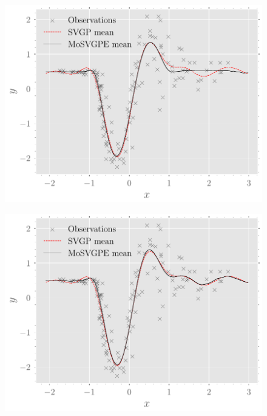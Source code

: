 \documentclass{mimosis-class/mimosis}
\numberwithin{equation}{chapter}
\begin{document}
{\begin{figure}[t!]
\centering
\begin{minipage}[r]{0.49\textwidth}
\includegraphics[width=\textwidth]{./images/model/mcycle/K=3_L2/y_means.pdf}
\label{fig-y-means-three-experts-tight}
\end{minipage}
\begin{minipage}[r]{0.49\textwidth}
\includegraphics[width=\textwidth]{./images/model/mcycle/K=3_L3/y_means.pdf}
\label{fig-y-means-three-experts-further}
\end{minipage}
\begin{minipage}[r]{0.49\textwidth}

\end{minipage}
\end{figure}}
\end{document}

